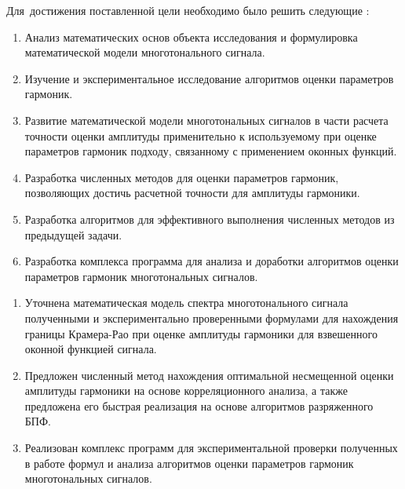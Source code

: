 
Для~достижения поставленной цели необходимо было решить следующие {\tasks}:
\begin{enumerate}
  \item Анализ математических основ объекта исследования и формулировка математической модели многотонального сигнала.
  
  \item Изучение и экспериментальное исследование алгоритмов оценки параметров гармоник.
  
  \item Развитие математической модели многотональных сигналов в части расчета точности оценки амплитуды применительно к используемому при оценке параметров гармоник подходу, связанному с применением оконных функций.
  
  \item Разработка численных методов для оценки параметров гармоник, позволяющих достичь расчетной точности для амплитуды гармоники.
  
  \item Разработка алгоритмов для эффективного выполнения численных методов из предыдущей задачи.
  
  \item Разработка комплекса программа для анализа и доработки алгоритмов оценки параметров гармоник многотональных сигналов.
\end{enumerate}


{\novelty}
 
\begin{enumerate}
  \item Уточнена математическая модель спектра многотонального сигнала полученными и экспериментально проверенными формулами для нахождения границы Крамера-Рао при оценке амплитуды гармоники для взвешенного оконной функцией сигнала.
  
  \item Предложен численный метод нахождения оптимальной несмещенной оценки амплитуды гармоники на основе корреляционного анализа, а также предложена его быстрая реализация на основе алгоритмов разряженного БПФ.
  
  \item Реализован комплекс программ для экспериментальной проверки полученных в работе формул и анализа алгоритмов оценки параметров гармоник многотональных сигналов.
\end{enumerate}

